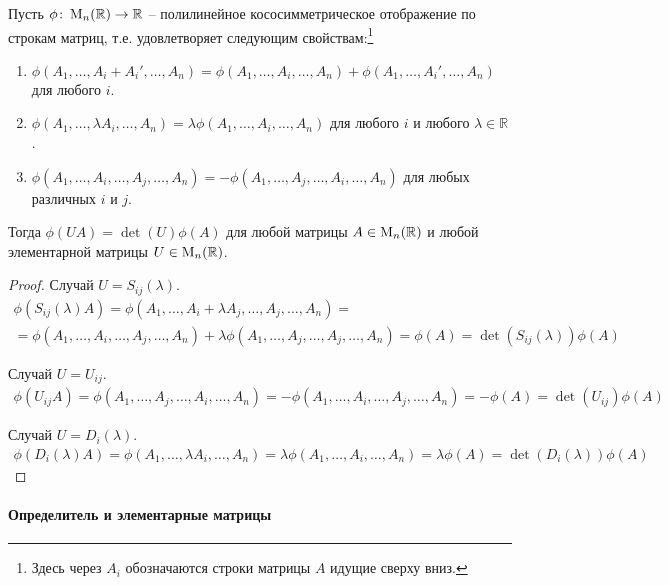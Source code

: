 \begin{claim}\label{claim::PolyAntiAndElementary}
Пусть $\phi\colon \operatorname{M}_{n}(\mathbb R)\to \mathbb R$ -- полилинейное кососимметрическое отображение по строкам матриц, т.е. удовлетворяет следующим свойствам:\footnote{Здесь через $A_i$ обозначаются строки матрицы $A$ идущие сверху вниз.}
\begin{enumerate}
\item $\phi(A_1,\ldots, A_i + A_i', \ldots, A_n) = \phi(A_1,\ldots, A_i, \ldots, A_n) + \phi(A_1,\ldots,A_i', \ldots, A_n)$ для любого $i$.

\item $\phi(A_1,\ldots, \lambda A_i, \ldots, A_n) = \lambda \phi(A_1,\ldots, A_i, \ldots, A_n)$ для любого $i$ и любого $\lambda\in\mathbb R$.

\item $\phi(A_1,\ldots, A_i, \ldots, A_j, \ldots, A_n) = -\phi(A_1,\ldots, A_j, \ldots, A_i, \ldots, A_n)$ для любых различных $i$ и $j$.
\end{enumerate}
Тогда $\phi(UA) = \det(U)\phi(A)$ для любой матрицы $A\in\operatorname{M}_{n}(\mathbb R)$ и любой элементарной матрицы $U\in\operatorname{M}_{n}(\mathbb R)$.
\end{claim}
\begin{proof}
Случай $U = S_{ij}(\lambda)$.
\begin{gather*}
\phi(S_{ij}(\lambda)A) = \phi(A_1,\ldots, A_i + \lambda A_j, \ldots, A_j, \ldots, A_n) = \\
= \phi(A_1,\ldots, A_i, \ldots, A_j, \ldots, A_n) + \lambda\phi(A_1,\ldots, A_j, \ldots, A_j, \ldots, A_n) =  \phi(A) = \det(S_{ij}(\lambda))\phi(A)
\end{gather*}

Случай $U= U_{ij}$.
\begin{gather*}
\phi(U_{ij}A) = \phi(A_1,\ldots, A_j, \ldots, A_i, \ldots, A_n) = -\phi(A_1,\ldots, A_i, \ldots, A_j, \ldots, A_n) = -\phi(A) = \det(U_{ij})\phi(A)
\end{gather*}

Случай $U=D_i(\lambda)$.
\begin{gather*}
\phi(D_i(\lambda)A) = \phi(A_1,\ldots,\lambda A_i,\ldots, A_n) = \lambda \phi(A_1,\ldots, A_i,\ldots, A_n) = \lambda \phi(A) = \det(D_i(\lambda))\phi(A)
\end{gather*}
\end{proof}

\paragraph{Определитель и элементарные матрицы}

